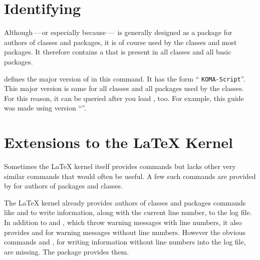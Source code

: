\section{Identifying \KOMAScript}

Although\,---\,or especially because\,---\, is generally
designed as a package for authors of classes and packages, it is of course
used by the \KOMAScript{} classes and most \KOMAScript{} packages. It
therefore contains a that is present in all \KOMAScript{} classes
and all basic \KOMAScript{} packages.

\begin{Declaration}
\end{Declaration}
\KOMAScript{} defines the major version of \KOMAScript{} in this command. It
has the form ``  \texttt{KOMA-Script}''. This major
version is same for all \KOMAScript{} classes and all \KOMAScript{} packages
used by the classes. For this reason, it can be queried after you
load , too. For example, this guide was made using
\KOMAScript{} version ``\KOMAScriptVersion''.
%
\EndIndexGroup


\section{Extensions to the \LaTeX{} Kernel}

Sometimes the \LaTeX{} kernel itself provides commands but lacks other very
similar commands that would often be useful. A few such commands are provided
by  for authors of packages and classes.

\begin{Declaration}
\end{Declaration}%
The \LaTeX{} kernel already provides authors of classes and packages commands
like  and  to write information, along
with the current line number, to the log file. In addition to
 and , which throw warning messages
with line numbers, it also provides  and
 for warning messages without line numbers. However
the obvious commands  and ,
for writing information without line numbers into the log file, are missing.
The  package provides them.
%
\EndIndexGroup


